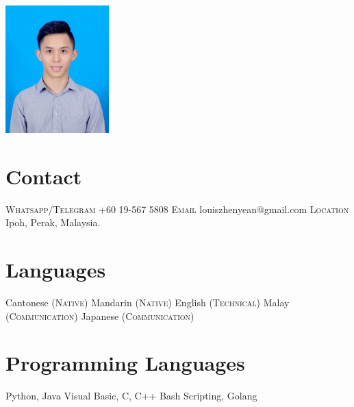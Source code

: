 \documentclass[English]{cv-style}
\begin{document}
\lastupdated

\begin{aside}
\includegraphics[width=4cm]{mypicture.jpg}
\section{Contact}\vspace{0.15cm}
\textsc{Whatsapp/Telegram}
+60 19-567 5808
\vspace{0.2cm} \textsc{Email}
louiszhenyean@gmail.com
\vspace{0.2cm} \textsc{Location}
Ipoh, Perak, Malaysia.
\section{Languages}\vspace{0.15cm}
Cantonese   \textsc{(Native)}
Mandarin    \textsc{(Native)}
English     \textsc{(Technical)}
Malay       \textsc{(Communication)}
Japanese    \textsc{(Communication)}
\section{Programming Languages}\vspace{0.15cm}
Python, Java
Visual Basic, C, C++
Bash Scripting, Golang

\end{aside}
\end{document}
